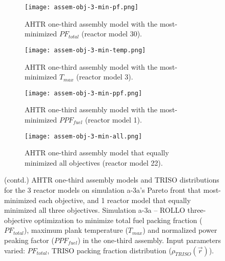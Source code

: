 \begin{figure}[htbp!]
    \ContinuedFloat
    \begin{subfigure}{0.49\textwidth}
        \centering
        \texttt{[image: assem-obj-3-min-pf.png]}
        \caption{\gls{AHTR} one-third assembly model with the most-minimized $PF_{total}$ 
        (reactor model 30).}
        \label{fig:assem-obj-3-min-pf} 
    \end{subfigure}
    \begin{subfigure}{0.49\textwidth}
        \centering
        \texttt{[image: assem-obj-3-min-temp.png]}
        \caption{\gls{AHTR} one-third assembly model with the most-minimized $T_{max}$
        (reactor model 3).}
        \label{fig:assem-obj-3-min-temp} 
    \end{subfigure}
    \begin{subfigure}{0.49\textwidth}
        \centering
        \texttt{[image: assem-obj-3-min-ppf.png]}
        \caption{\gls{AHTR} one-third assembly model with the most-minimized $PPF_{fuel}$
        (reactor model 1).}
        \label{fig:assem-obj-3-min-ppf} 
    \end{subfigure}
    \begin{subfigure}{0.49\textwidth}
        \centering
        \texttt{[image: assem-obj-3-min-all.png]}
        \caption{\gls{AHTR} one-third assembly model that equally minimized all objectives
        (reactor model 22).}
        \label{fig:assem-obj-3-min-all} 
    \end{subfigure}
    \begin{subfigure}{.3\textwidth}
    \vspace{1cm}
    \centering
\end{subfigure}
    \caption{(contd.) AHTR one-third assembly models and TRISO distributions for the 
    3 reactor models on simulation a-3a's Pareto front that most-minimized each 
    objective, and 1 reactor model that equally minimized all three objectives.
    Simulation a-3a -- ROLLO three-objective optimization to minimize total fuel packing 
    fraction ($PF_{total}$), maximum plank temperature ($T_{max}$) and 
    normalized power peaking factor ($PPF_{fuel}$) in the one-third assembly. 
    Input parameters varied: $PF_{total}$, TRISO packing fraction distribution
    ($\rho_{TRISO}(\vec{r})$).}
\end{figure}

